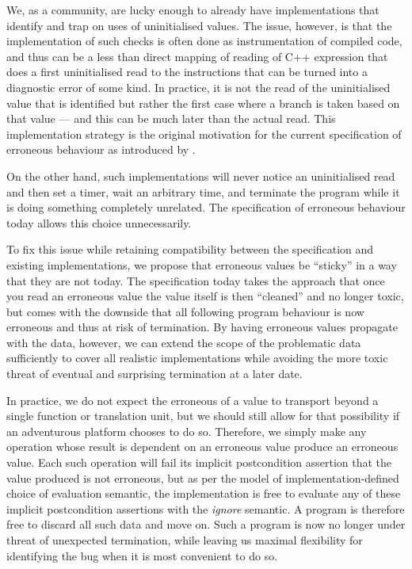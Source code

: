 We, as a community, are lucky enough to already have implementations that identify and trap on uses of uninitialised values.  The issue, however, is that the implementation of such checks is often done as instrumentation of compiled code, and thus can be a less than direct mapping of reading of C++ expression that does a first uninitialised read to the instructions that can be turned into a diagnostic error of some kind.   In practice, it is not the read of the uninitialised value that is identified but rather the first case where a branch is taken based on that value --- and this can be much later than the actual read. This implementation strategy is the original motivation for the current specification of erroneous behaviour as introduced by \cite{P2795R5}.

On the other hand, such implementations will never notice an uninitialised read and then set a timer, wait an arbitrary time, and terminate the program while it is doing something completely unrelated.  The specification of erroneous behaviour today allows this choice unnecessarily.

To fix this issue while retaining compatibility between the specification and existing implementations, we propose that erroneous values be ``sticky'' in a way that they are not today.  The specification today takes the approach that once you read an erroneous value the value itself is then ``cleaned'' and no longer toxic, but comes with the downside that all following program behaviour is now erroneous and thus at risk of termination.    By having erroneous values propagate with the data, however, we can extend the scope of the problematic data sufficiently to cover all realistic implementations while avoiding the more toxic threat of eventual and surprising termination at a later date.

In practice, we do not expect the erroneous of a value to transport beyond a single function or translation unit, but we should still allow for that possibility if an adventurous platform chooses to do so.   Therefore, we simply make any operation whose result is dependent on an erroneous value produce an erroneous value. Each such operation will fail its implicit postcondition assertion that the value produced is not erroneous, but as per the \cite{P2900R13} model of implementation-defined choice of evaluation semantic, the implementation is free to evaluate any of these implicit postcondition assertions with the \emph{ignore} semantic. A program is therefore free to discard all such data and move on. Such a program is now no longer under threat of unexpected termination, while leaving us maximal flexibility for identifying the bug when it is most convenient to do so.

